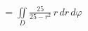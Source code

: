 \documentclass[preview]{standalone}
\begin{document}
\begin{align*}
= \iint\limits_D \frac{25}{25 - r^2} \, r \, dr \, d\varphi
\end{align*}
\end{document}
